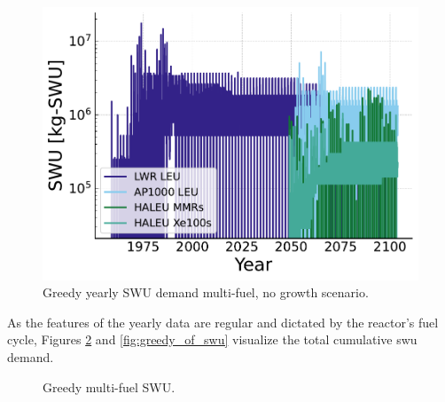 \begin{figure}[H]
    \centering
    \includegraphics[scale=0.7]{images/results/swu/multi_dgng_swu_by_fuel.pdf}
    \caption{Greedy yearly SWU demand multi-fuel, no growth scenario.}
    \label{fig:swu_yearly_greedy}
\end{figure}

As the features of the yearly data are regular and dictated by the reactor's fuel cycle, Figures \ref{fig:greedy_mf_swu} and \ref{fig:greedy_of_swu} visualize the total cumulative \gls{swu} demand.

\begin{figure}[H]
  \hfill
  \caption{Greedy multi-fuel SWU.}
  \label{fig:greedy_mf_swu}
\end{figure}


